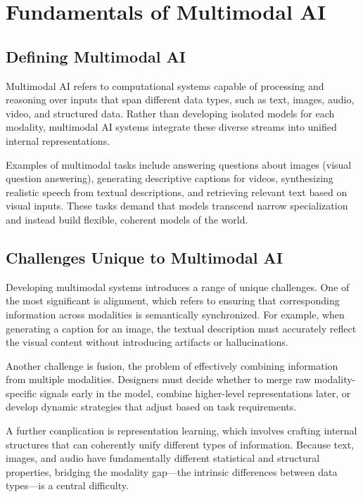 \documentclass[openany]{book}
\begin{document}
\section{Fundamentals of Multimodal AI}

\subsection{Defining Multimodal AI}

Multimodal AI refers to computational systems capable of processing and reasoning 
over inputs that span different data types, such as text, images, audio, video, 
and structured data. Rather than developing isolated models for each modality, 
multimodal AI systems integrate these diverse streams into unified internal 
representations.

Examples of multimodal tasks include answering questions about images (visual 
question answering), generating descriptive captions for videos, synthesizing 
realistic speech from textual descriptions, and retrieving relevant text based on 
visual inputs. These tasks demand that models transcend narrow specialization and 
instead build flexible, coherent models of the world.

\subsection{Challenges Unique to Multimodal AI}

Developing multimodal systems introduces a range of unique challenges. One of the 
most significant is alignment, which refers to ensuring that corresponding 
information across modalities is semantically synchronized. For example, when 
generating a caption for an image, the textual description must accurately reflect 
the visual content without introducing artifacts or hallucinations.

Another challenge is fusion, the problem of effectively combining information from 
multiple modalities. Designers must decide whether to merge raw modality-specific 
signals early in the model, combine higher-level representations later, or develop 
dynamic strategies that adjust based on task requirements.

A further complication is representation learning, which involves crafting 
internal structures that can coherently unify different types of information. 
Because text, images, and audio have fundamentally different statistical and 
structural properties, bridging the modality gap---the intrinsic differences 
between data types---is a central difficulty.
\end{document}
